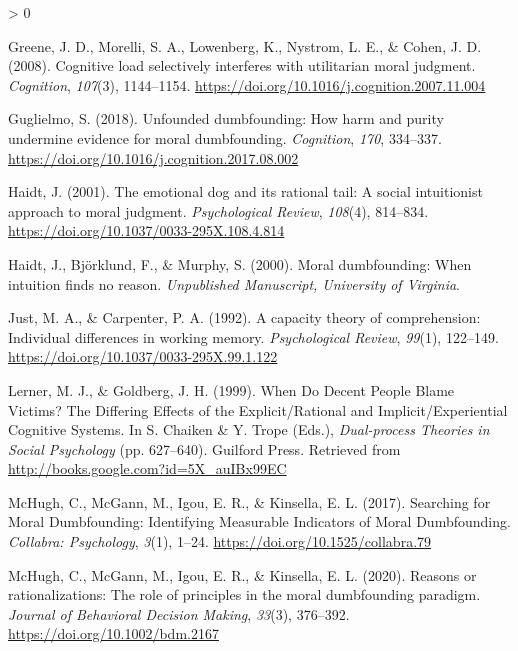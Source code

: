 \documentclass[
  american,
  man,floatsintext]{apa7}
\newlength{\cslhangindent}
\newenvironment{CSLReferences}[2] %
 {%
  \setlength{\parindent}{0pt}
  \ifodd #1 \everypar{\setlength{\hangindent}{\cslhangindent}}\ignorespaces\fi
  \ifnum #2 > 0
  \setlength{\parskip}{#2\baselineskip}
  \fi
 }%
 {}
\begin{document}
\begin{CSLReferences}{1}{0}
\leavevmode\hypertarget{ref-greene_cognitive_2008}{}%
Greene, J. D., Morelli, S. A., Lowenberg, K., Nystrom, L. E., \& Cohen, J. D. (2008). Cognitive load selectively interferes with utilitarian moral judgment. \emph{Cognition}, \emph{107}(3), 1144--1154. \url{https://doi.org/10.1016/j.cognition.2007.11.004}

\leavevmode\hypertarget{ref-guglielmo_unfounded_2018}{}%
Guglielmo, S. (2018). Unfounded dumbfounding: How harm and purity undermine evidence for moral dumbfounding. \emph{Cognition}, \emph{170}, 334--337. \url{https://doi.org/10.1016/j.cognition.2017.08.002}

\leavevmode\hypertarget{ref-haidt_emotional_2001}{}%
Haidt, J. (2001). The emotional dog and its rational tail: A social intuitionist approach to moral judgment. \emph{Psychological Review}, \emph{108}(4), 814--834. \url{https://doi.org/10.1037/0033-295X.108.4.814}

\leavevmode\hypertarget{ref-haidt_moral_2000}{}%
Haidt, J., Björklund, F., \& Murphy, S. (2000). Moral dumbfounding: When intuition finds no reason. \emph{Unpublished Manuscript, University of Virginia}.

\leavevmode\hypertarget{ref-just_capacity_1992}{}%
Just, M. A., \& Carpenter, P. A. (1992). A capacity theory of comprehension: Individual differences in working memory. \emph{Psychological Review}, \emph{99}(1), 122--149. \url{https://doi.org/10.1037/0033-295X.99.1.122}

\leavevmode\hypertarget{ref-lerner_when_1999}{}%
Lerner, M. J., \& Goldberg, J. H. (1999). When {Do Decent People Blame Victims}? The {Differing Effects} of the {Explicit}/{Rational} and {Implicit}/{Experiential Cognitive Systems}. In S. Chaiken \& Y. Trope (Eds.), \emph{Dual-process {Theories} in {Social Psychology}} (pp. 627--640). {Guilford Press}. Retrieved from \url{http://books.google.com?id=5X_auIBx99EC}

\leavevmode\hypertarget{ref-mchugh_searching_2017a}{}%
McHugh, C., McGann, M., Igou, E. R., \& Kinsella, E. L. (2017). Searching for {Moral Dumbfounding}: Identifying {Measurable Indicators} of {Moral Dumbfounding}. \emph{Collabra: Psychology}, \emph{3}(1), 1--24. \url{https://doi.org/10.1525/collabra.79}

\leavevmode\hypertarget{ref-mchugh_reasons_2020}{}%
McHugh, C., McGann, M., Igou, E. R., \& Kinsella, E. L. (2020). Reasons or rationalizations: The role of principles in the moral dumbfounding paradigm. \emph{Journal of Behavioral Decision Making}, \emph{33}(3), 376--392. \url{https://doi.org/10.1002/bdm.2167}


\end{CSLReferences}
\end{document}
